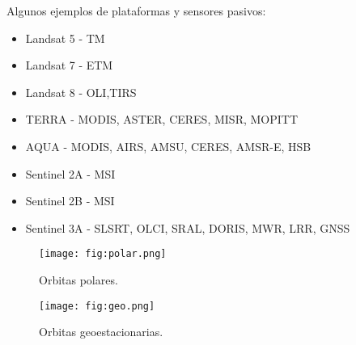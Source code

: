 \begin{frame}{}
  Algunos ejemplos de plataformas y sensores pasivos:
  \begin{itemize}
    \item<1->{Landsat 5 - TM}
    \item<2-> Landsat 7 - ETM
    \item<3-> Landsat 8 - OLI,TIRS
    \item<4-> TERRA - MODIS, ASTER, CERES, MISR, MOPITT
    \item<5-> AQUA - MODIS, AIRS, AMSU, CERES, AMSR-E, HSB
    \item<6-> Sentinel 2A - MSI
    \item<7-> Sentinel 2B - MSI
    \item<8-> Sentinel 3A - SLSRT, OLCI, SRAL, DORIS, MWR, LRR, GNSS
  \end{itemize}
\end{frame}

\begin{frame}{}
\end{frame}

\begin{frame}{}
  \begin{figure}
    \centering
    \texttt{[image: fig:polar.png]}
    \caption{Orbitas polares.}
    \label{}
  \end{figure}
\end{frame}

\begin{frame}{}
  \begin{figure}
    \centering
    \texttt{[image: fig:geo.png]}
    \caption{Orbitas geoestacionarias.}
    \label{}
  \end{figure}
\end{frame}

